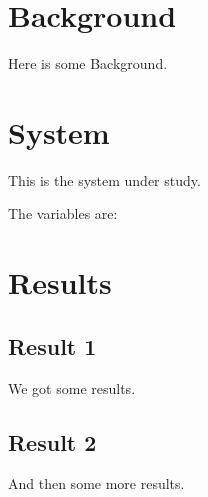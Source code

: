 \documentclass{article}
\begin{document}
\tableofcontents

\section{Background}

Here is some Background.

\section{System}

This is the system under study.

The variables are:

\section{Results}

\subsection{Result 1}

We got some results.

\subsection{Result 2}

And then some more results.
\end{document}
